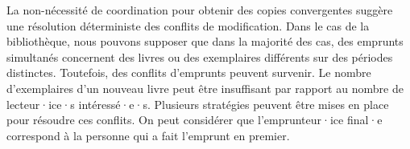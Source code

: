 %
%
%
%

La non-nécessité de coordination pour obtenir des copies convergentes suggère une résolution déterministe des conflits de modification.
Dans le cas de la bibliothèque, nous pouvons supposer que dans la majorité des cas, des emprunts simultanés concernent des livres ou des exemplaires différents sur des périodes distinctes.
Toutefois, des conflits d'emprunts peuvent survenir.
Le nombre d'exemplaires d'un nouveau livre peut être insuffisant par rapport au nombre de lecteur·ice·s intéressé·e·s.
Plusieurs stratégies peuvent être mises en place pour résoudre ces conflits.
On peut considérer que l'emprunteur·ice final·e correspond à la personne qui a fait l'emprunt en premier.

